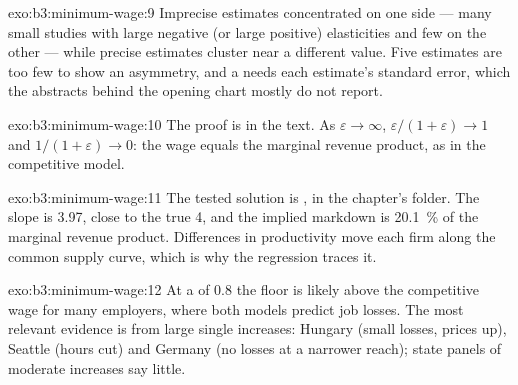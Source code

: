 \begin{solution}{exo:b3:minimum-wage:9}
Imprecise estimates concentrated on one side --- many small studies with large
negative (or large positive) elasticities and few on the other --- while precise
estimates cluster near a different value. Five estimates are too few to show an
asymmetry, and a  needs each estimate's standard error, which the
abstracts behind the opening chart mostly do not report.
\end{solution}

\begin{solution}{exo:b3:minimum-wage:10}
The proof is in the text. As $\varepsilon \to \infty$, $\varepsilon/(1 + \varepsilon) \to 1$ and $1/(1 + \varepsilon) \to 0$: the wage equals the marginal
revenue product, as in the competitive model.
\end{solution}

\begin{solution}{exo:b3:minimum-wage:11}
The tested solution is , in the chapter's 
folder. The slope is 3.97, close to the true 4, and the implied markdown is 20.1~\% of the
marginal revenue product. %
Differences in productivity move each firm along the common supply curve, which is
why the regression traces it.
\end{solution}

\begin{solution}{exo:b3:minimum-wage:12}
At a  of 0.8 the floor is likely above the competitive wage for many
employers, where both models predict job losses. The most relevant evidence is from
large single increases: Hungary (small losses, prices up), Seattle (hours cut) and
Germany (no losses at a narrower reach); state panels of moderate increases say little.
\end{solution}

